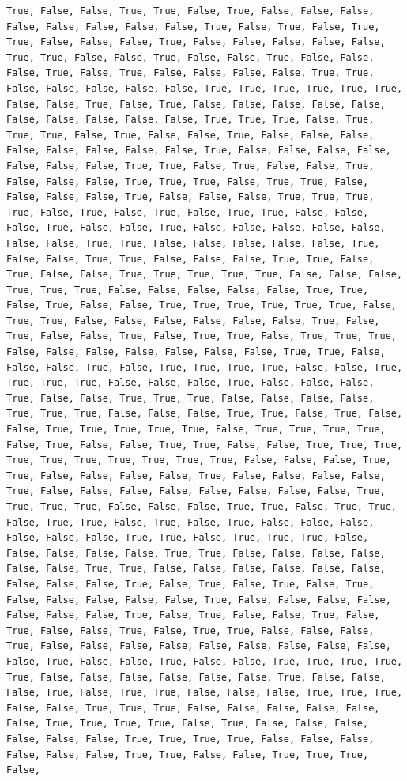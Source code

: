 \documentclass[
  letterpaper,
  DIV=11,
  numbers=noendperiod]{scrartcl}
\begin{document}
\begin{verbatim}
True, False, False, True, True, False, True, False, False, False, False, False, False, False, False, True, False, True, False, True, True, False, False, False, True, False, False, False, False, False, True, True, False, False, True, False, False, True, False, False, False, True, False, True, False, False, False, False, True, True, False, False, False, False, False, True, True, True, True, True, True, False, False, True, False, True, False, False, False, False, False, False, False, False, False, False, True, True, True, False, True, True, True, False, True, False, False, True, False, False, False, False, False, False, False, False, True, False, False, False, False, False, False, False, True, True, False, True, False, False, True, False, False, False, True, True, True, False, True, True, False, False, False, False, True, False, False, False, True, True, True, True, False, True, False, True, False, True, True, False, False, False, True, False, False, True, False, False, False, False, False, False, False, True, True, False, False, False, False, False, True, False, False, True, True, False, False, False, True, True, False, True, False, False, True, True, True, True, True, False, False, False, True, True, True, False, False, False, False, False, True, True, False, True, False, False, True, True, True, True, True, True, False, True, True, False, False, False, False, False, False, True, False, True, False, False, True, False, True, True, False, True, True, True, False, False, False, False, False, False, False, True, True, False, False, False, True, False, True, True, True, True, False, False, True, True, True, True, False, False, False, True, False, False, False, True, False, False, True, True, True, False, False, False, False, True, True, True, False, False, False, True, True, False, True, False, False, True, True, True, True, True, False, True, True, True, True, False, True, False, False, True, True, False, False, True, True, True, True, True, True, True, True, True, True, False, False, False, True, True, False, False, False, False, True, False, False, False, False, True, False, False, False, False, False, False, False, False, True, True, True, True, False, False, False, True, True, False, True, True, False, True, True, False, True, False, True, False, False, False, False, False, False, True, True, False, True, True, True, False, False, False, False, False, True, True, False, False, False, False, False, False, True, True, False, False, False, False, False, False, False, False, False, True, False, True, False, True, False, True, False, False, False, False, False, True, False, False, False, False, False, False, False, True, False, True, False, False, True, False, True, False, False, True, False, True, True, False, False, False, True, False, False, False, False, False, False, False, False, False, False, True, False, False, True, False, False, True, True, True, True, True, False, False, False, False, False, False, True, False, False, False, True, False, True, True, False, False, False, True, True, True, False, False, True, True, True, False, False, False, False, False, False, True, True, True, True, False, True, False, False, False, False, False, False, True, True, True, True, False, False, False, False, False, False, True, True, False, False, True, True, True, False, 
\end{verbatim}
\end{document}
